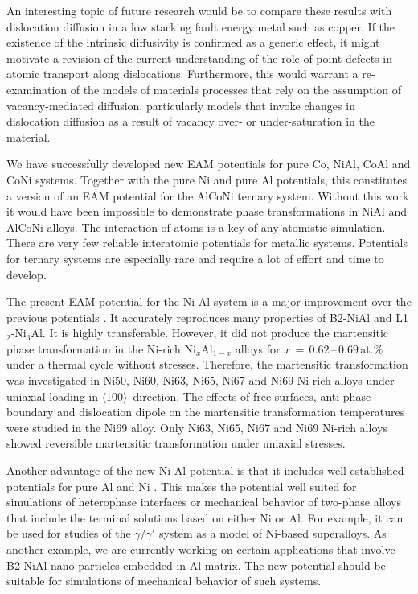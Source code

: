 An interesting topic of future research would be to compare these results with
dislocation diffusion in a low stacking fault energy metal such as copper. If
the existence of the intrinsic diffusivity is confirmed as a generic effect,
it might motivate a revision of the current understanding of the role of point
defects in atomic transport along dislocations. Furthermore, this would warrant
a re-examination of the models of materials processes that rely on the assumption
of vacancy-mediated diffusion, particularly models that invoke changes in dislocation
diffusion as a result of vacancy over- or under-saturation in the material.

We have successfully developed new EAM potentials for pure Co, NiAl, CoAl and CoNi systems. Together with the pure Ni and pure Al potentials, this constitutes a version of an EAM potential for the AlCoNi ternary system. Without this work it would have been impossible to demonstrate phase transformations in NiAl and AlCoNi alloys. The interaction of atoms is a key of any atomistic simulation. There are very few reliable interatomic potentials for metallic systems. Potentials for ternary systems are especially rare and require a lot of effort and time to develop.
 
The present EAM potential for the Ni-Al system is a major improvement over the previous potentials  \cite{Mishin02c,Mishin2004a}. It accurately reproduces many properties of B2-NiAl and L1$_2$-Ni$_3$Al. It is highly transferable. However, it did not produce the martensitic phase transformation in the Ni-rich Ni$_x$Al$_{1-x}$ alloys for $x\,=\,0.62$\,--\,$0.69$\,at.\% under a thermal cycle without stresses. Therefore, the martensitic transformation was investigated in Ni50, Ni60, Ni63, Ni65, Ni67 and Ni69 Ni-rich alloys under uniaxial loading in $\langle 100\rangle$\  direction. The effects of free surfaces, anti-phase boundary and dislocation dipole on the martensitic transformation temperatures were studied in the Ni69 alloy. Only Ni63, Ni65, Ni67 and Ni69 Ni-rich alloys showed reversible martensitic transformation under uniaxial stresses.

Another advantage of the new Ni-Al potential is that it includes well-established
potentials for pure Al \cite{Mishin99b} and Ni \cite{Mishin2004a}. This makes
the potential well suited for simulations of heterophase interfaces or mechanical
behavior of two-phase alloys that include the terminal solutions based on either
Ni or Al. For example, it can be used for studies of the $\gamma$/$\gamma\prime$
system as a model of Ni-based superalloys. As another example, we are currently
working on certain applications that involve B2-NiAl nano-particles embedded
in Al matrix. The new potential should be suitable for simulations of mechanical
behavior of such systems.

